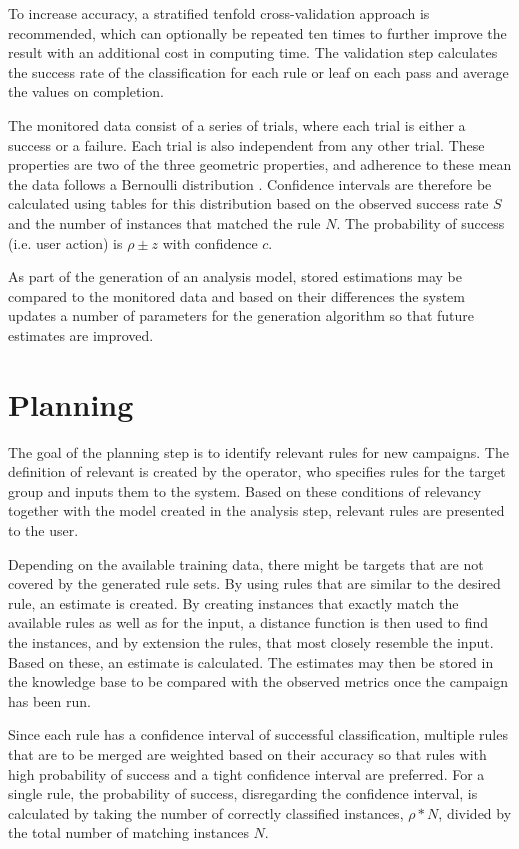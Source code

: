 \documentclass[11pt,a4paper]{report}
\begin{document}
To increase accuracy, a stratified tenfold cross-validation approach is recommended, which can optionally be repeated ten times to further improve the result with an additional cost in computing time. The validation step calculates the success rate of the classification for each rule or leaf on each pass and average the values on completion.

The monitored data consist of a series of trials, where each trial is either a success or a failure. Each trial is also independent from any other trial. These properties are two of the three geometric properties, and adherence to these mean the data follows a Bernoulli distribution \citep{Milton2002}. Confidence intervals are therefore be calculated using tables for this distribution \citep[chap. 5]{Witten2011} based on the observed success rate \(S\) and the number of instances that matched the rule \(N\). The probability of success (i.e. user action) is \(\rho \pm z\) with confidence \(c\).

As part of the generation of an analysis model, stored estimations may be compared to the monitored data and based on their differences the system updates a number of parameters for the generation algorithm so that future estimates are improved.

\section{Planning}
The goal of the planning step is to identify relevant rules for new campaigns. The definition of relevant is created by the operator, who specifies rules for the target group and inputs them to the system. Based on these conditions of relevancy together with the model created in the analysis step, relevant rules are presented to the user.

Depending on the available training data, there might be targets that are not covered by the generated rule sets. By using rules that are similar to the desired rule, an estimate is created. By creating instances that exactly match the available rules as well as for the input, a distance function is then used to find the instances, and by extension the rules, that most closely resemble the input. Based on these, an estimate is calculated. The estimates may then be stored in the knowledge base to be compared with the observed metrics once the campaign has been run.

Since each rule has a confidence interval of successful classification, multiple rules that are to be merged are weighted based on their accuracy so that rules with high probability of success and a tight confidence interval are preferred. For a single rule, the probability of success, disregarding the confidence interval, is calculated by taking the number of correctly classified instances, \(\rho*N\), divided by the total number of matching instances \(N\).
\end{document}
